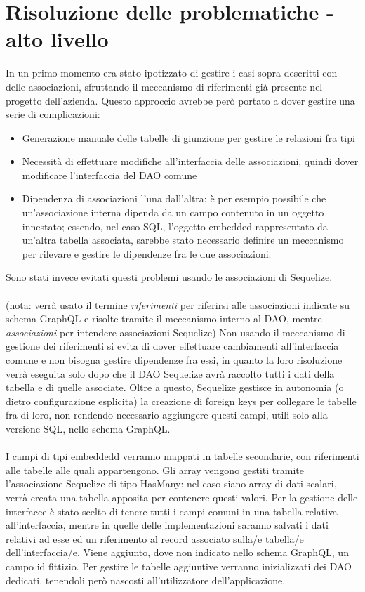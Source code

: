 \documentclass[a4paper, 12pt]{report}
\begin{document}
    \section{Risoluzione delle problematiche - alto livello}
      In un primo momento era stato ipotizzato di gestire i casi sopra descritti con delle associazioni, sfruttando il meccanismo di riferimenti già presente nel progetto dell'azienda.
      Questo approccio avrebbe però portato a dover gestire una serie di complicazioni:
      \begin{itemize}
        \item Generazione manuale delle tabelle di giunzione per gestire le relazioni fra tipi
        \item Necessità di effettuare modifiche all'interfaccia delle associazioni, quindi dover modificare l'interfaccia del DAO comune
        \item Dipendenza di associazioni l'una dall'altra: è per esempio possibile che un'associazione interna dipenda da un campo contenuto in un oggetto innestato; essendo, nel caso SQL, l'oggetto embedded rappresentato da un'altra tabella associata, sarebbe stato necessario definire un meccanismo per rilevare e gestire le dipendenze fra le due associazioni.
      \end{itemize}
      Sono stati invece evitati questi problemi usando le associazioni di Sequelize.
      \paragraph*{}
      (nota: verrà usato il termine \emph{riferimenti} per riferirsi alle associazioni indicate su schema GraphQL e risolte tramite il meccanismo interno al DAO, mentre \emph{associazioni} per intendere associazioni Sequelize)
      Non usando il meccanismo di gestione dei riferimenti si evita di dover effettuare cambiamenti all'interfaccia comune e non bisogna gestire dipendenze fra essi, in quanto la loro risoluzione verrà eseguita solo dopo che il DAO Sequelize avrà raccolto tutti i dati della tabella e di quelle associate.
      Oltre a questo, Sequelize gestisce in autonomia (o dietro configurazione esplicita) la creazione di foreign keys per collegare le tabelle fra di loro, non rendendo necessario aggiungere questi campi, utili solo alla versione SQL, nello schema GraphQL.
      \paragraph*{}
      I campi di tipi embeddedd verranno mappati in tabelle secondarie, con riferimenti alle tabelle alle quali appartengono.
      Gli array vengono gestiti tramite l'associazione Sequelize di tipo HasMany: nel caso siano array di dati scalari, verrà creata una tabella apposita per contenere questi valori.
      Per la gestione delle interfacce è stato scelto di tenere tutti i campi comuni in una tabella relativa all'interfaccia, mentre in quelle delle implementazioni saranno salvati i dati relativi ad esse ed un riferimento al record associato sulla/e tabella/e dell'interfaccia/e.
      Viene aggiunto, dove non indicato nello schema GraphQL, un campo id fittizio.
      Per gestire le tabelle aggiuntive verranno inizializzati dei DAO dedicati, tenendoli però nascosti all'utilizzatore dell'applicazione.
\end{document}

